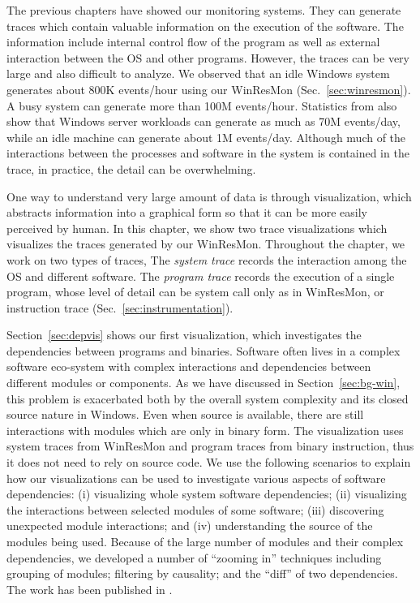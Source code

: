 
The previous chapters have showed our monitoring systems.
They can generate traces which contain valuable information on
the execution of the software.
The information include internal control flow of the program as well
as external interaction between the OS and other programs.
However, the traces can be very large and also difficult to analyze.
We observed that an idle Windows system generates about 800K
events/hour using our WinResMon (Sec.~\ref{sec:winresmon}).
A busy system can generate more than 100M events/hour.
Statistics from \cite{verbowski6flight} also show that Windows
server workloads can generate as much as 70M events/day,
while an idle machine can generate about 1M events/day.
Although much of the interactions between the processes and software in the
system is contained in the trace, in practice, the detail
can be overwhelming.

One way to understand very large amount of data is through visualization,
which abstracts information into a graphical form so that it can be more
easily perceived by human.
In this chapter, we show two trace visualizations which visualizes
the traces generated by our WinResMon.
Throughout the chapter,
we work on two types of traces,
The {\em system trace} records the interaction among the OS and
different software.
The {\em program trace} records the execution of a single program,
whose level of detail can be system call only as in WinResMon, or
instruction trace (Sec.~\ref{sec:instrumentation}).

Section~\ref{sec:depvis} shows our first visualization, which
investigates the dependencies between programs and binaries.
Software often lives in a complex software eco-system
with complex interactions and dependencies between different
modules or components.
As we have discussed in Section~\ref{sec:bg-win},
this problem is exacerbated both by the 
overall system complexity and its closed source nature in Windows.
Even when source is available, there are still interactions with
modules which are only in binary form.
The visualization uses system traces from WinResMon and
program traces from binary instruction,
thus it does not need to rely on source code.
We use the following scenarios to explain how our visualizations can
be used to investigate various aspects of software dependencies:
(i) visualizing whole system software dependencies;
(ii) visualizing the interactions between selected modules of some software;
(iii) discovering unexpected module interactions; 
and (iv) understanding the source of the modules being used.
Because of the large number of modules and their complex dependencies,
we developed a number of ``zooming in'' techniques including
grouping of modules;
filtering by causality; and
the ``diff'' of two dependencies.
The work has been published in \cite{wu2010comprehending}.

